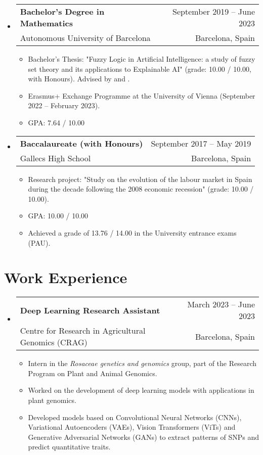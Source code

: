 \documentclass[a4paper,10pt]{article}
\makeatletter
\newcommand{\resumeQuadHeading}[4]{
  \item
  \begin{tabular*}{0.96\textwidth}[t]{l@{\extracolsep{\fill}}r}
    \textbf{#1} & \small #2 \\
    \small#3 & \small #4 \\
  \end{tabular*}
}
\newcommand{\resumeHeadingListStart}{
  \begin{itemize}[leftmargin=0.15in, label={}]
}
\newcommand{\resumeHeadingListEnd}{\end{itemize}}
\makeatother
\begin{document}
    \resumeHeadingListStart{}
      \resumeQuadHeading{Bachelor's Degree in Mathematics}{September 2019 – June 2023}
      {Autonomous University of Barcelona}{Barcelona, Spain}
      \begin{itemize}[leftmargin=3em, itemsep=0.1em, topsep=2pt]
          \item \small Bachelor's Thesis: "Fuzzy Logic in Artificial Intelligence: a study of fuzzy set theory and its applications to Explainable AI" (grade: 10.00 / 10.00, with Honours). Advised by  \href{https://www.iiia.csic.es/es/people/person/?person_id=35}{} and \href{https://mat.uab.cat/~pitsch/}{}.
          \item \small Erasmus+ Exchange Programme at the University of Vienna (September 2022 – February 2023).
          \item \small GPA: 7.64 / 10.00
      \end{itemize}
    \resumeHeadingListEnd{}
  
  \resumeHeadingListStart{}
    \resumeQuadHeading{Baccalaureate (with Honours)}{September 2017 – May 2019}
    {Gallecs High School}{Barcelona, Spain}
    \begin{itemize}[leftmargin=3em, itemsep=0.1em, topsep=2pt]
      \item \small Research project: "Study on the evolution of the labour market in Spain during the decade following the 2008 economic recession" (grade: 10.00 / 10.00).
      \item \small GPA: 10.00 / 10.00
      \item \small Achieved a grade of 13.76 / 14.00 in the University entrance exams (PAU).
    \end{itemize}
  \resumeHeadingListEnd{}


\section{Work Experience}
  \resumeHeadingListStart{}
    \resumeQuadHeading{Deep Learning Research Assistant}{March 2023 – June 2023}
    {Centre for Research in Agricultural Genomics (CRAG)}{Barcelona, Spain}
    \begin{itemize}[leftmargin=3em, itemsep=0.1em, topsep=2pt]
      \item \small Intern in the \textit{Rosaceae genetics and genomics} group, part of the Research Program on Plant and Animal Genomics.
      \item \small Worked on the development of deep learning models with applications in plant genomics. 
      \item \small Developed models based on Convolutional Neural Networks (CNNs), Variational Autoencoders (VAEs), Vision Transformers (ViTs) and Generative Adversarial Networks (GANs) to extract patterns of SNPs and predict quantitative traits.
    \end{itemize}
  \resumeHeadingListEnd{}
\end{document}
